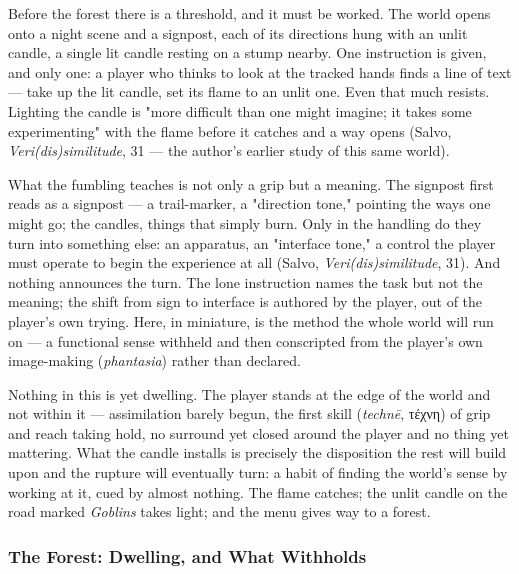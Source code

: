 \documentclass{article}
\newcommand{\gk}[1]{{\greekfont #1}}
\begin{document}
Before the forest there is a threshold, and it must be worked. The world opens onto a night scene and a signpost, each of its directions hung with an unlit candle, a single lit candle resting on a stump nearby. One instruction is given, and only one: a player who thinks to look at the tracked hands finds a line of text — take up the lit candle, set its flame to an unlit one. Even that much resists. Lighting the candle is "more difficult than one might imagine; it takes some experimenting" with the flame before it catches and a way opens (Salvo, \textit{Veri(dis)similitude}, 31 — the author's earlier study of this same world).

What the fumbling teaches is not only a grip but a meaning. The signpost first reads as a signpost — a trail-marker, a "direction tone," pointing the ways one might go; the candles, things that simply burn. Only in the handling do they turn into something else: an apparatus, an "interface tone," a control the player must operate to begin the experience at all (Salvo, \textit{Veri(dis)similitude}, 31). And nothing announces the turn. The lone instruction names the task but not the meaning; the shift from sign to interface is authored by the player, out of the player's own trying. Here, in miniature, is the method the whole world will run on — a functional sense withheld and then conscripted from the player's own image-making (\textit{phantasia}) rather than declared.

Nothing in this is yet dwelling. The player stands at the edge of the world and not within it — assimilation barely begun, the first skill (\textit{technē}, \gk{τέχνη}) of grip and reach taking hold, no surround yet closed around the player and no thing yet mattering. What the candle installs is precisely the disposition the rest will build upon and the rupture will eventually turn: a habit of finding the world's sense by working at it, cued by almost nothing. The flame catches; the unlit candle on the road marked \textit{Goblins} takes light; and the menu gives way to a forest.

\subsubsection*{The Forest: Dwelling, and What Withholds}
\end{document}
